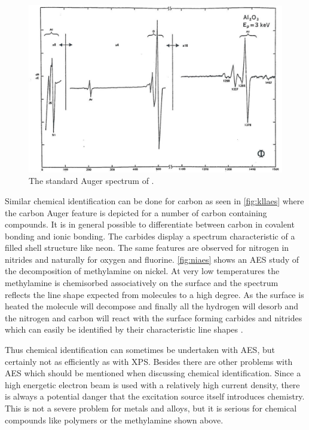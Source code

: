 \begin{figure}[h!]
	\begin{center}
	\includegraphics[scale=4]{figures/06_09.png}
	\caption{The standard Auger spectrum of .}
	\label{fig:al2o3aes}
	\end{center}
\end{figure}

Similar chemical identification can be done for carbon as seen in \autoref{fig:kllaes} where the carbon Auger feature is depicted for a number of carbon containing compounds. It is in general possible to differentiate between carbon in covalent bonding and ionic bonding. The carbides display a spectrum characteristic of a filled shell structure like neon. The same features are observed for nitrogen in nitrides and naturally for oxygen and fluorine. \autoref{fig:niaes} shows an AES study of the decomposition of methylamine on nickel. At very low temperatures the methylamine is chemisorbed associatively on the surface and the spectrum reflects the line shape expected from molecules to a high degree. As the surface is heated the molecule will decompose and finally all the hydrogen will desorb and the nitrogen and carbon will react with the surface forming carbides and nitrides which can easily be identified by their characteristic line shapes \cite{chorkendorff3}.

Thus chemical identification can sometimes be undertaken with AES, but certainly not as efficiently as with XPS. Besides there are other problems with AES  which should be mentioned when discussing chemical identification. Since a high energetic electron beam is used with a relatively high current density, there is always a potential danger that the excitation source itself introduces chemistry. This is not a severe problem for metals and alloys, but it is serious for chemical compounds like polymers or the methylamine shown above.

